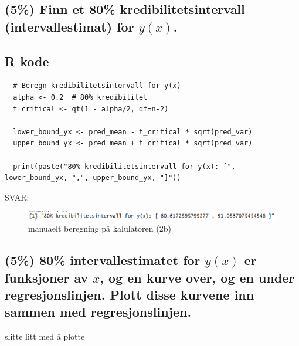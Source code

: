 \documentclass[12pt]{article}
\begin{document}
\subsection{(5\%) Finn et 80\% kredibilitetsintervall (intervallestimat) for $y(x)$.}
\subsection{R kode}
\begin{verbatim}
  # Beregn kredibilitetsintervall for y(x)
  alpha <- 0.2  # 80% kredibilitet
  t_critical <- qt(1 - alpha/2, df=n-2)
  
  lower_bound_yx <- pred_mean - t_critical * sqrt(pred_var)
  upper_bound_yx <- pred_mean + t_critical * sqrt(pred_var)
  
  print(paste("80% kredibilitetsintervall for y(x): [", lower_bound_yx, ",", upper_bound_yx, "]"))  
\end{verbatim} 
SVAR:
\begin{figure}[H]
  \centering
  \includegraphics[width=1\textwidth]{3e.png}
  \caption{manuaelt beregning på kalulatoren (2b)}
\end{figure}



\subsection{(5\%) 80\% intervallestimatet for $y(x)$ er funksjoner av $x$, og en kurve over, og en under regresjonslinjen. Plott disse kurvene inn sammen med regresjonslinjen.}
slitte litt med å plotte
\end{document}
